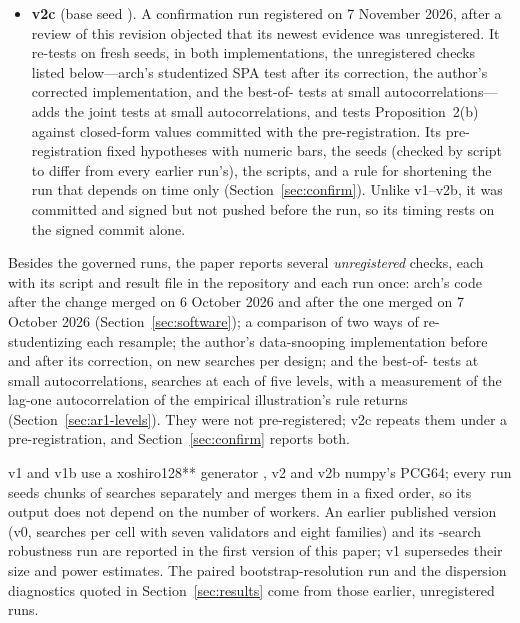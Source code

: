 \begin{itemize}
  \item \textbf{v2c} (base seed ). A confirmation run registered on 7 November 2026, after a review of this revision objected that its newest evidence was unregistered. It re-tests on fresh seeds, in both implementations, the unregistered checks listed below---arch's studentized SPA test after its correction, the author's corrected implementation, and the best-of- tests at small autocorrelations---adds the joint tests at small autocorrelations, and tests Proposition~2(b) against closed-form values committed with the pre-registration. Its pre-registration fixed  hypotheses with numeric bars, the seeds (checked by script to differ from every earlier run's), the scripts, and a rule for shortening the run that depends on time only (Section~\ref{sec:confirm}). Unlike v1--v2b, it was committed and signed but not pushed before the run, so its timing rests on the signed commit alone.
\end{itemize}
Besides the governed runs, the paper reports several \emph{unregistered} checks, each with its script and result file in the repository and each run once: arch's code after the change merged on 6 October 2026 and after the one merged on 7 October 2026 (Section~\ref{sec:software}); a comparison of two ways of re-studentizing each resample; the author's data-snooping implementation before and after its correction, on  new searches per design; and the best-of- tests at small autocorrelations,  searches at each of five levels, with a measurement of the lag-one autocorrelation of the empirical illustration's rule returns (Section~\ref{sec:ar1-levels}). They were not pre-registered; v2c repeats them under a pre-registration, and Section~\ref{sec:confirm} reports both.

v1 and v1b use a xoshiro128** generator \citep{blackman2021scrambled}, v2 and v2b numpy's PCG64; every run seeds chunks of searches separately and merges them in a fixed order, so its output does not depend on the number of workers. An earlier published version (v0,  searches per cell with seven validators and eight families) and its -search robustness run are reported in the first version of this paper; v1 supersedes their size and power estimates. The paired bootstrap-resolution run and the dispersion diagnostics quoted in Section~\ref{sec:results} come from those earlier, unregistered runs.
